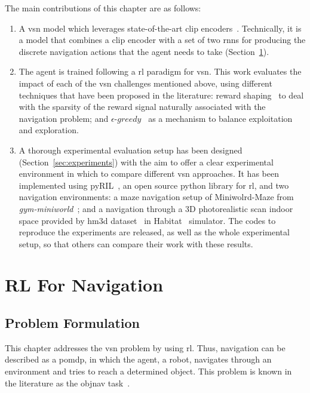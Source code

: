 The main contributions of this chapter are as follows:
\begin{enumerate}
    \item A \acrshort{vsn} model which leverages state-of-the-art \acrfull{clip} encoders~\cite{radford2021}.
    Technically, it is a model that combines a \acrshort{clip} encoder with a set of two \acrshort{rnn}s for producing the discrete navigation actions that the agent needs to take (Section~\ref{sec:navigation}).
    \item The agent is trained following a \acrshort{rl} paradigm for \acrshort{vsn}.
    This work evaluates the impact of each of the \acrshort{vsn} challenges mentioned above, using different techniques that have been proposed in the literature: reward shaping~\cite{sutton2018, wijmans2020} to deal with the sparsity of the reward signal naturally associated with the navigation problem; and $\epsilon\text{-}greedy$~\cite{mnih2013} as a mechanism to balance exploitation and exploration.
    \item A thorough experimental evaluation setup has been designed (Section~\ref{sec:experiments}) with the aim to offer a clear experimental environment in which to compare different \acrshort{vsn} approaches.
    It has been implemented using pyRIL~\cite{pyRIL}, an open source python library for \acrshort{rl}, and two navigation environments: a maze navigation setup of Miniwolrd-Maze from \textit{gym-miniworld}~\cite{gym_miniworld}; and a navigation through a 3D photorealistic scan indoor space provided by \acrshort{hm3d} dataset~\cite{ramakrishnan2021} in Habitat~\cite{szot2021} simulator.
    The codes to reproduce the experiments are released, as well as the whole experimental setup, so that others can compare their work with these results.
\end{enumerate}


\section{RL For Navigation}\label{sec:navigation}

\subsection{Problem Formulation}\label{subsec:problem-formulation}

This chapter addresses the \acrshort{vsn} problem by using \acrshort{rl}.
Thus, navigation can be described as a \acrfull{pomdp}, in which the agent, \ie a robot, navigates through an environment and tries to reach a determined object.
This problem is known in the literature as the \acrfull{objnav} task~\cite{batra2020}.

